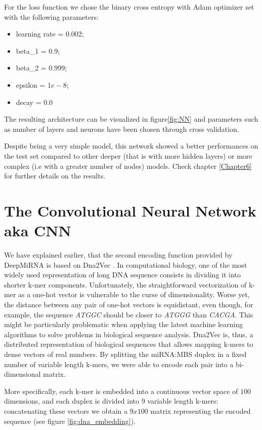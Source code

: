 For the loss function we chose the binary cross entropy with Adam optimizer set with the following parameters:

\begin{itemize}
	\item learning rate = 0.002;
	\item beta\_1 = 0.9;
	\item beta\_2 = 0.999;
	\item epsilon = $1e-8$;
	\item decay = 0.0
\end{itemize}

The resulting architecture can be visualized in figure\ref{fig:NN} and parameters such as number of layers and neurons have been chosen through cross validation.

Despite being a very simple model, this network showed a better performances on the test set compared to other deeper (that is with more hidden layers) or more complex (i.e with a greater number of nodes) models. Check chapter \ref{Chapter6} for further details on the results.

\section{The Convolutional Neural Network aka CNN}
We have explained earlier, that the second encoding function provided by DeepMiRNA is based on Dna2Vec \cite{dna_distributed_repr}. In computational biology, one of the most widely used representation of long DNA sequence consists in dividing it into shorter k-mer components.  Unfortunately, the straightforward vectorization of k-mer as a one-hot vector is vulnerable to the curse of dimensionality. Worse yet, the distance between any pair of one-hot vectors is equidistant, even though, for example, the sequence \emph{ATGGC} should be closer to \emph{ATGGG} than \emph{CACGA}. This might be particularly problematic when applying the latest machine learning algorithms to solve problems in biological sequence analysis. Dna2Vec is, thus, a distributed representation of biological sequences that allows mapping k-mers to dense vectors of real numbers. By splitting the miRNA:MBS duplex in a fixed number of variable length k-mers, we were able to encode each pair into a bi-dimensional matrix. 

More specifically, each k-mer is embedded into a continuous vector space of $100$ dimensions, and each duplex is divided into 9 variable length k-mers: concatenating these vectors we obtain a $9x100$ matrix representing the encoded sequence (see figure \ref{fig:dna_embedding}).

